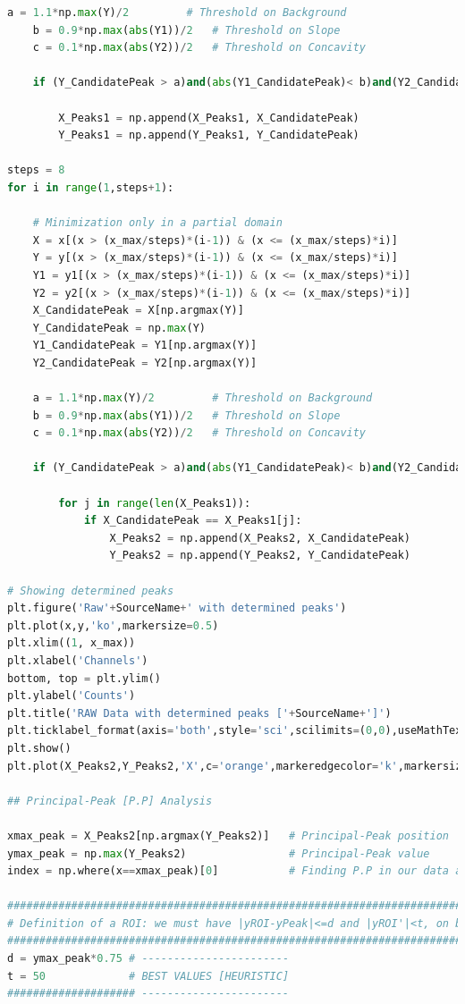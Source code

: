\begin{lstlisting}[language=python, style=Pystyle, caption=\texttt{Python} code for Spectral Peak Recognition Routine, label=list:PeakRoutine, 	captionpos=t]
	a = 1.1*np.max(Y)/2         # Threshold on Background
	b = 0.9*np.max(abs(Y1))/2   # Threshold on Slope
	c = 0.1*np.max(abs(Y2))/2   # Threshold on Concavity
	
	if (Y_CandidatePeak > a)and(abs(Y1_CandidatePeak)< b)and(Y2_CandidatePeak<-c)and(Y_CandidatePeak > 0.13*np.max(y)):
	
		X_Peaks1 = np.append(X_Peaks1, X_CandidatePeak)
		Y_Peaks1 = np.append(Y_Peaks1, Y_CandidatePeak)
	
steps = 8
for i in range(1,steps+1):
	
	# Minimization only in a partial domain
	X = x[(x > (x_max/steps)*(i-1)) & (x <= (x_max/steps)*i)]
	Y = y[(x > (x_max/steps)*(i-1)) & (x <= (x_max/steps)*i)]
	Y1 = y1[(x > (x_max/steps)*(i-1)) & (x <= (x_max/steps)*i)]
	Y2 = y2[(x > (x_max/steps)*(i-1)) & (x <= (x_max/steps)*i)]
	X_CandidatePeak = X[np.argmax(Y)]
	Y_CandidatePeak = np.max(Y)
	Y1_CandidatePeak = Y1[np.argmax(Y)]
	Y2_CandidatePeak = Y2[np.argmax(Y)]
	
	a = 1.1*np.max(Y)/2         # Threshold on Background
	b = 0.9*np.max(abs(Y1))/2   # Threshold on Slope
	c = 0.1*np.max(abs(Y2))/2   # Threshold on Concavity
	
	if (Y_CandidatePeak > a)and(abs(Y1_CandidatePeak)< b)and(Y2_CandidatePeak<-c)and(Y_CandidatePeak > 0.13*np.max(y)):
	
		for j in range(len(X_Peaks1)):
			if X_CandidatePeak == X_Peaks1[j]:
				X_Peaks2 = np.append(X_Peaks2, X_CandidatePeak)
				Y_Peaks2 = np.append(Y_Peaks2, Y_CandidatePeak)

# Showing determined peaks
plt.figure('Raw'+SourceName+' with determined peaks')
plt.plot(x,y,'ko',markersize=0.5)
plt.xlim((1, x_max))
plt.xlabel('Channels')
bottom, top = plt.ylim()
plt.ylabel('Counts')
plt.title('RAW Data with determined peaks ['+SourceName+']')
plt.ticklabel_format(axis='both',style='sci',scilimits=(0,0),useMathText=True)
plt.show()
plt.plot(X_Peaks2,Y_Peaks2,'X',c='orange',markeredgecolor='k',markersize=10,alpha=0.75)

## Principal-Peak [P.P] Analysis

xmax_peak = X_Peaks2[np.argmax(Y_Peaks2)]   # Principal-Peak position
ymax_peak = np.max(Y_Peaks2)                # Principal-Peak value
index = np.where(x==xmax_peak)[0]           # Finding P.P in our data array

########################################################################################
# Definition of a ROI: we must have |yROI-yPeak|<=d and |yROI'|<t, on both sides of P.P.
########################################################################################
d = ymax_peak*0.75 # -----------------------
t = 50             # BEST VALUES [HEURISTIC]
#################### -----------------------


\end{lstlisting}
